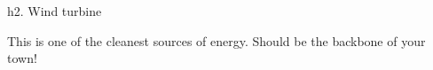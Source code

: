 h2. Wind turbine

This is one of the cleanest sources of energy. Should be the backbone of your town!
